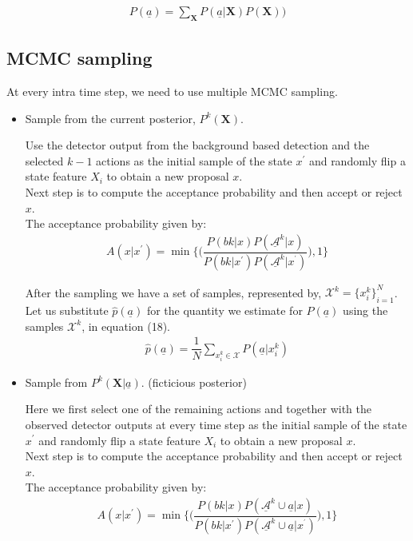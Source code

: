 \documentclass[10pt,twocolumn,letterpaper]{article}
\begin{document}
\begin{align}
 P(\underline{a}) = \sum_{\textbf{X}}P( \underline{a}|\textbf{X})P(\textbf{X}))
\end{align}
\subsection{MCMC sampling}
At every intra time step, we need to use multiple MCMC sampling.
\begin{itemize}
\item Sample from the current posterior, $P^{k}(\textbf{X})$.

Use the detector output from the background based detection and the selected $k-1$ actions as the initial sample of the state $x^{'} $ and randomly flip a state feature $X_{i}$ to obtain a new proposal $x $.\\
Next step is to compute the acceptance probability and then accept or reject $x$.\\
The acceptance probability given by:
\begin{align}
A(x|x^{'}) = \min\Big\lbrace\Big(\dfrac{P(bk|x)P(\underline{\mathcal{A}}^{k}|x)}{P(bk|x^{'})P(\underline{\mathcal{A}}^{k}|x^{^{'}})}\Big),1\Big\rbrace
\end{align}

After the sampling we have a set of samples, represented by,
 $\mathcal{X}^{k}={\lbrace x^{k}_{i}\rbrace}^{N}_{i=1}$.\\
Let us substitute $\widehat{p}( \underline{a})$ for the quantity we estimate for $P( \underline{a})$ using the samples $\mathcal{X}^{k}$, in equation (18).
\begin{align}
\widehat{p}( \underline{a}) = \dfrac{1}{N}\sum_{x^{k}_{i}\in \mathcal{X}}P( \underline{a}|x_{i}^{k})
\end{align}


\item Sample from $P^{k}(\textbf{X}|\underline{a})$. (ficticious posterior)

Here we first select one of the remaining actions and together with the observed detector outputs at every time step as the initial sample of the state $x^{'} $ and randomly flip a state feature $X_{i}$ to obtain a new proposal $x $.\\
Next step is to compute the acceptance probability and then accept or reject $x$.\\
The acceptance probability given by:
\begin{align}
A(x|x^{'}) = \min\Big\lbrace\Big(\dfrac{P(bk|x)P(\underline{\mathcal{A}}^{k}\cup \underline{a}|x)}{P(bk|x^{'})P(\underline{\mathcal{A}}^{k}\cup \underline{a}|x^{^{'}})}\Big),1\Big\rbrace
\end{align}
\end{itemize}
\end{document}
